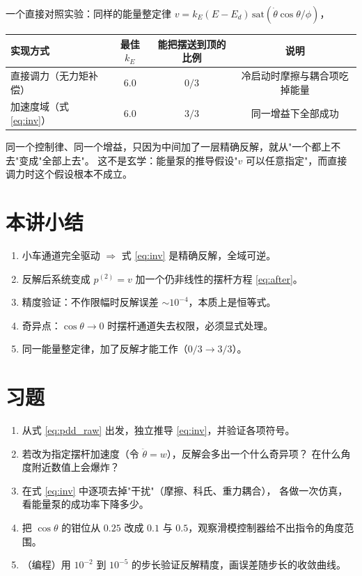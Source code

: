 一个直接对照实验：同样的能量整定律 $v = k_E(E-E_d)\,\mathrm{sat}(\dot\theta\cos\theta/\phi)$，

\begin{center}
\small
\begin{tabular}{@{}lccc@{}}
\toprule
实现方式 & 最佳 $k_E$ & 能把摆送到顶的比例 & 说明 \\
\midrule
直接调力（无力矩补偿） & $6.0$ & $0/3$ & 冷启动时摩擦与耦合项吃掉能量 \\
加速度域（式 \eqref{eq:inv}） & $6.0$ & $3/3$ & 同一增益下全部成功 \\
\bottomrule
\end{tabular}
\end{center}

同一个控制律、同一个增益，只因为中间加了一层精确反解，就从"一个都上不去"变成"全部上去"。
这不是玄学：能量泵的推导假设"$v$ 可以任意指定"，而直接调力时这个假设根本不成立。


\section{本讲小结}

\begin{enumerate}[leftmargin=2em,itemsep=2pt]
  \item 小车通道完全驱动 $\Rightarrow$ 式 \eqref{eq:inv} 是精确反解，全域可逆。
  \item 反解后系统变成 $p^{(2)}=v$ 加一个仍非线性的摆杆方程 \eqref{eq:after}。
  \item 精度验证：不作限幅时反解误差 $\sim10^{-4}$，本质上是恒等式。
  \item 奇异点：$\cos\theta\to0$ 时摆杆通道失去权限，必须显式处理。
  \item 同一能量整定律，加了反解才能工作（$0/3\to3/3$）。
\end{enumerate}

\section*{习题}
\begin{enumerate}[leftmargin=2em,itemsep=6pt]
  \item 从式 \eqref{eq:pdd_raw} 出发，独立推导 \eqref{eq:inv}，并验证各项符号。
  \item 若改为指定摆杆加速度（令 $\ddot\theta=w$），反解会多出一个什么奇异项？
        在什么角度附近数值上会爆炸？
  \item 在式 \eqref{eq:inv} 中逐项去掉"干扰"（摩擦、科氏、重力耦合），
        各做一次仿真，看能量泵的成功率下降多少。
  \item 把 $\cos\theta$ 的钳位从 $0.25$ 改成 $0.1$ 与 $0.5$，观察滑模控制器给不出指令的角度范围。
  \item （编程）用 $10^{-2}$ 到 $10^{-5}$ 的步长验证反解精度，画误差随步长的收敛曲线。
\end{enumerate}

